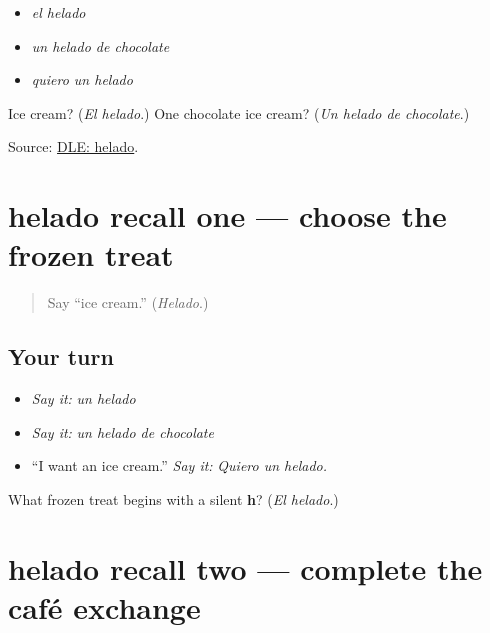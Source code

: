 \begin{itemize}
\raggedright
  \item \emph{el helado}
  \item \emph{un helado de chocolate}
  \item \emph{quiero un helado}
\end{itemize}

\begin{tcolorbox}[breakable,colback=teal!4,colframe=teal!35!black,title={Before you move on}]
Ice cream? (\emph{El helado}.) One chocolate ice cream? (\emph{Un helado de chocolate}.)

Source: \href{https://dle.rae.es/helado}{DLE: helado}.
\end{tcolorbox}
\section[(review)]{helado recall one — choose the frozen treat}

\label{lesson:ES-C411-helado-recall-1}



\begin{quote}
Say “ice cream.” (\emph{Helado}.)
\end{quote}

\subsection*{Your turn}
\begin{itemize}
\raggedright
  \item \emph{Say it:} \emph{un helado}
  \item \emph{Say it:} \emph{un helado de chocolate}
  \item “I want an ice cream.” \emph{Say it:} \emph{Quiero un helado.}
\end{itemize}

\begin{tcolorbox}[breakable,colback=teal!4,colframe=teal!35!black,title={Before you move on}]
What frozen treat begins with a silent \textbf{h}? (\emph{El helado}.)
\end{tcolorbox}
\section[(review)]{helado recall two — complete the café exchange}

\label{lesson:ES-C411-helado-recall-2}



